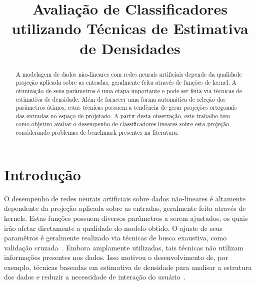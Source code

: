 \documentclass[conference]{IEEEtran}
\begin{document}
	
	\title{Avaliação de Classificadores utilizando Técnicas de Estimativa de Densidades}
	
	
	\author{
		}
	
	
	
	\maketitle
	
	\begin{abstract}
		A modelagem de dados não-lineares com redes neurais artificiais depende da qualidade projeção aplicada sobre as entradas, geralmente feita através de funções de kernel. A otimização de seus parâmetros é uma etapa importante e pode ser feita via técnicas de estimativa de densidade. Além de fornecer uma forma automática de seleção dos parâmetros ótimos, estas técnicas possuem a tendência de gerar projeções ortogonais das entradas no espaço de projetado. A partir desta observação, este trabalho tem como objetivo avaliar o desempenho de classificadores lineares sobre esta projeção, considerando problemas de benchmark presentes na literatura. 
	\end{abstract}

	\section{Introdução}
	
	O desempenho de redes neurais artificiais sobre dados não-lineares é altamente dependente da projeção aplicada sobre as entradas, geralmente feita através de kernels. Estas funções possuem diversos parâmetros a serem ajustados, os quais irão afetar diretamente a qualidade do modelo obtido. O ajuste de seus paramêtros é geralmente realizado via técnicas de busca exaustiva, como validação cruzada~\cite{cortes1995support}. Embora amplamente utilizadas, tais técnicas não utilizam informações presentes nos dados. Isso motivou o desenvolvimento de, por exemplo, técnicas baseadas em estimativa de densidade para analisar a estrutura dos dados e reduzir a necessidade de interação do usuário~\cite{menezes2019width}. 
	
\end{document}
